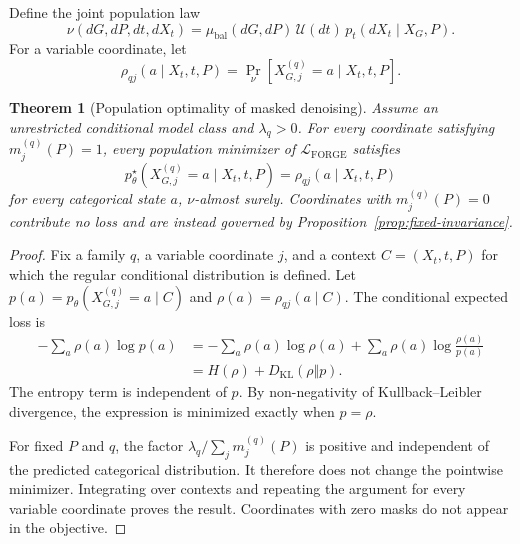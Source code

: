 \documentclass{article}
\newtheorem{theorem}{Theorem}[section]
\begin{document}
Define the joint population law
\begin{equation}
    \nu(dG,dP,dt,dX_t)
    =
    \mu_{\mathrm{bal}}(dG,dP)\,
    \mathcal U(dt)\,
    p_t(dX_t\mid X_G,P).
\end{equation}
For a variable coordinate, let
\begin{equation}
    \rho_{qj}(a\mid X_t,t,P)
    =
    \Pr_{\nu}\!\left[
        X_{G,j}^{(q)}=a
        \mid X_t,t,P
    \right].
\end{equation}

\begin{theorem}[Population optimality of masked denoising]
\label{thm:masked-consistency}
Assume an unrestricted conditional model class and $\lambda_q>0$.
For every coordinate satisfying $m_j^{(q)}(P)=1$, every population minimizer of
$\mathcal L_{\mathrm{FORGE}}$ satisfies
\begin{equation}
    p_\theta^\star\!\left(
        X_{G,j}^{(q)}=a
        \mid X_t,t,P
    \right)
    =
    \rho_{qj}(a\mid X_t,t,P)
\end{equation}
for every categorical state $a$, $\nu$-almost surely.
Coordinates with $m_j^{(q)}(P)=0$ contribute no loss and are instead governed by
Proposition~\ref{prop:fixed-invariance}.
\end{theorem}

\begin{proof}
Fix a family $q$, a variable coordinate $j$, and a context $C=(X_t,t,P)$ for which the regular
conditional distribution is defined.
Let $p(a)=p_\theta(X_{G,j}^{(q)}=a\mid C)$ and
$\rho(a)=\rho_{qj}(a\mid C)$.
The conditional expected loss is
\begin{align}
    -\sum_a \rho(a)\log p(a)
    &=
    -\sum_a \rho(a)\log\rho(a)
    +
    \sum_a \rho(a)\log\frac{\rho(a)}{p(a)}\\
    &=
    H(\rho)
    +
    D_{\mathrm{KL}}(\rho\Vert p).
\end{align}
The entropy term is independent of $p$.
By non-negativity of Kullback--Leibler divergence, the expression is minimized exactly when
$p=\rho$.

For fixed $P$ and $q$, the factor
$\lambda_q/\sum_j m_j^{(q)}(P)$ is positive and independent of the predicted categorical
distribution.
It therefore does not change the pointwise minimizer.
Integrating over contexts and repeating the argument for every variable coordinate proves the
result.
Coordinates with zero masks do not appear in the objective.
\end{proof}
\end{document}
